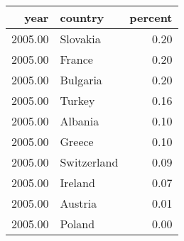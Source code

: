 \begin{table}[ht]
\centering
\begin{tabular}{rlr}
  \hline
year & country & percent \\ 
  \hline
2005.00 & Slovakia & 0.20 \\ 
  2005.00 & France & 0.20 \\ 
  2005.00 & Bulgaria & 0.20 \\ 
  2005.00 & Turkey & 0.16 \\ 
  2005.00 & Albania & 0.10 \\ 
  2005.00 & Greece & 0.10 \\ 
  2005.00 & Switzerland & 0.09 \\ 
  2005.00 & Ireland & 0.07 \\ 
  2005.00 & Austria & 0.01 \\ 
  2005.00 & Poland & 0.00 \\ 
   \hline
\end{tabular}
\end{table}
